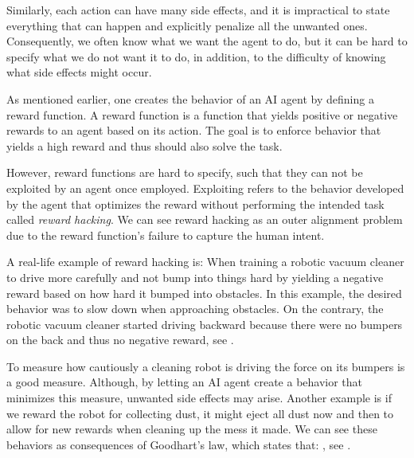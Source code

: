 \documentclass[12pt,A4]{report}
\theoremstyle{definition}
\begin{document}
Similarly, each action can have many side effects, and it is impractical to state everything that can happen and explicitly penalize all the unwanted ones. Consequently, we often know what we want the agent to do, but it can be hard to specify what we do not want it to do, in addition, to the difficulty of knowing what side effects might occur.


As mentioned earlier, one creates the behavior of an AI agent by defining a reward function. A reward function is a function that yields positive or negative rewards to an agent based on its action. The goal is to enforce behavior that yields a high reward and thus should also solve the task. 

However, reward functions are hard to specify, such that they can not be exploited by an agent once employed. Exploiting refers to the behavior developed by the agent that optimizes the reward without performing the intended task called \textit{reward hacking}. We can see reward hacking as an outer alignment problem due to the reward function's failure to capture the human intent.

A real-life example of reward hacking is: When training a robotic vacuum cleaner to drive more carefully and not bump into things hard by yielding a negative reward based on how hard it bumped into obstacles. In this example, the desired behavior was to slow down when approaching obstacles. On the contrary, the robotic vacuum cleaner started driving backward because there were no bumpers on the back and thus no negative reward, see \citet{Smingleigh}. 

To measure how cautiously a cleaning robot is driving the force on its bumpers is a good measure. Although, by letting an AI agent create a behavior that minimizes this measure, unwanted side effects may arise. Another example is if we reward the robot for collecting dust, it might eject all dust now and then to allow for new rewards when cleaning up the mess it made. We can see these behaviors as consequences of Goodhart's law, which states that: , see \citet{wikiGoodhart}. %
\end{document}

